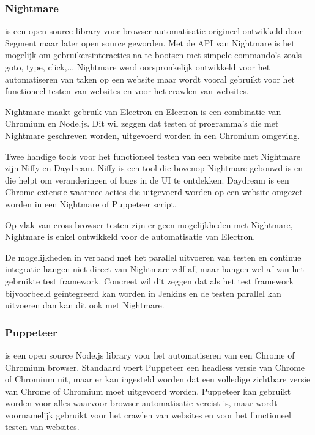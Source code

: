 \subsubsection{Nightmare}

\textcite{Nightmare} is een open source \gls{library} voor browser automatisatie origineel ontwikkeld door Segment maar later open source geworden. Met de \gls{API} van Nightmare is het mogelijk om gebruikersinteracties na te bootsen met simpele commando's zoals goto, type, click,... Nightmare werd oorspronkelijk ontwikkeld voor het automatiseren van taken op een website maar wordt vooral gebruikt voor het functioneel testen van websites en voor het crawlen van websites.

Nightmare maakt gebruik van Electron en Electron is een combinatie van Chromium en Node.js. Dit wil zeggen dat testen of programma's die met Nightmare geschreven worden, uitgevoerd worden in een Chromium omgeving.

Twee handige \glspl{tool} voor het functioneel testen van een website met Nightmare zijn Niffy en Daydream. Niffy is een \gls{tool} die bovenop Nightmare gebouwd is en die helpt om veranderingen of bugs in de \gls{UI} te ontdekken. Daydream is een Chrome extensie waarmee acties die uitgevoerd worden op een website omgezet worden in een Nightmare of Puppeteer script.

Op vlak van cross-browser testen zijn er geen mogelijkheden met Nightmare, Nightmare is enkel ontwikkeld voor de automatisatie van Electron.

De mogelijkheden in verband met het parallel uitvoeren van testen en continue integratie hangen niet direct van Nightmare zelf af, maar hangen wel af van het gebruikte test \gls{framework}. Concreet wil dit zeggen dat als het test \gls{framework} bijvoorbeeld geïntegreerd kan worden in Jenkins en de testen parallel kan uitvoeren dan kan dit ook met Nightmare.

\subsubsection{Puppeteer}
\textcite{Puppeteer} is een open source Node.js \gls{library} voor het automatiseren van een Chrome of Chromium browser. Standaard voert Puppeteer een \gls{headless} versie van Chrome of Chromium uit, maar er kan ingesteld worden dat een volledige zichtbare versie van Chrome of Chromium moet uitgevoerd worden. Puppeteer kan gebruikt worden voor alles waarvoor browser automatisatie vereist is, maar wordt voornamelijk gebruikt voor het crawlen van websites en voor het functioneel testen van websites.

